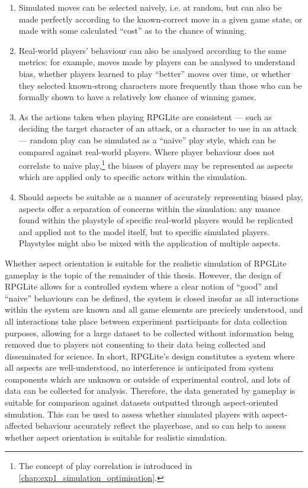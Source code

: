 \begin{enumerate}
    \item Simulated moves can be selected naively, i.e. at random, but can also be made perfectly according to the known-correct move in a given game state, or made with some calculated ``cost'' as to the chance of winning.
    \item Real-world players' behaviour can also be analysed according to the same metrics: for example, moves made by players can be analysed to understand bias, whether players learned to play ``better'' moves over time, or whether they selected known-strong characters more frequently than those who can be formally shown to have a relatively low chance of winning games.
    \item As the actions taken when playing RPGLite are consistent --- such as deciding the target character of an attack, or a character to use in an attack --- random play can be simulated as a ``naive'' play style, which can be compared against real-world players. Where player behaviour does not correlate to naive play,\footnote{The concept of play correlation is introduced in \cref{chap:exp1_simulation_optimisation}.} the biases of players may be represented as aspects which are applied only to specific actors within the simulation.
    \item Should aspects be suitable as a manner of accurately representing biased play, aspects offer a separation of concerns within the simulation: any nuance found within the playstyle of specific real-world players would be replicated and applied not to the model itself, but to specific simulated players. Playstyles might also be mixed with the application of multiple aspects.
\end{enumerate}
 
Whether aspect orientation is suitable for the realistic simulation of RPGLite gameplay is the topic of the remainder of this thesis. However, the design of RPGLite allows for a controlled system where a clear notion of ``good'' and ``naive'' behaviours can be defined, the system is closed insofar as all interactions within the system are known and all game elements are precicely understood, and all interactions take place between experiment participants for data collection purposes, allowing for a large dataset to be collected without information being removed due to players not consenting to their data being collected and disseminated for science. In short, RPGLite's design constitutes a system where all aspects are well-understood, no interference is anticipated from system components which are unknown or outside of experimental control, and lots of data can be collected for analysis. Therefore, the data generated by gameplay is suitable for comparison against datasets outputted through aspect-oriented simulation. This can be used to assess whether simulated players with aspect-affected behaviour accurately reflect the playerbase, and so can help to assess whether aspect orientation is suitable for realistic simulation.

